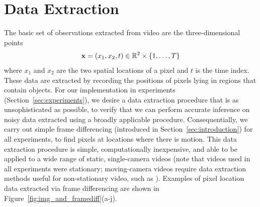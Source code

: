 \documentclass[twocolumn, final]{svjour3}
\begin{document}

\section{Data Extraction}
\label{sec:dataextraction}

The basic set of observations extracted from video are the three-dimensional points
\begin{equation}
  \centering
  \bold{x} = ( x_{1}, x_{2}, t ) \in \mathbb{R}^{2} \times \{ 1, \ldots, T \}
\end{equation}
where $x_{1}$ and $x_{2}$ are the two spatial locations of a pixel and $t$ is the time index. These data are extracted by recording the positions of pixels lying in regions that contain objects. For our implementation in experiments (Section~\ref{sec:experiments}), we desire a data extraction procedure that is as unsophisticated as possible, to verify that we can perform accurate inference on noisy data extracted using a broadly applicable procedure. Consequentially, we carry out simple frame differencing (introduced in Section~\ref{sec:introduction}) for all experiments, to find pixels at locations where there is motion. This data extraction procedure is simple, computationally inexpensive, and able to be applied to a wide range of static, single-camera videos (note that videos used in all experiments were stationary; moving-camera videos require data extraction methods useful for non-stationary video, such as \cite{chien2002efficient, zhang2007moving}). Examples of pixel location data extracted via frame differencing are shown in Figure~\ref{fig:img_and_framediff}(a-j).
\end{document}
